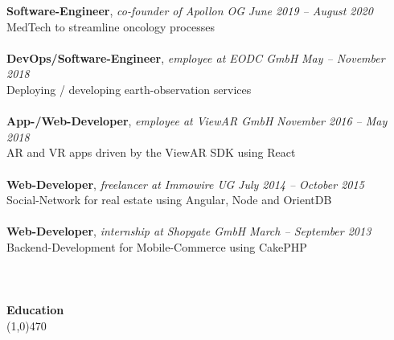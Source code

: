 \documentclass[10pt]{article} %
\begin{document}
\noindent
\noindent
{\bf Software-Engineer}, \textit{co-founder of Apollon OG}  \hfill \textit{ June 2019 -- August 2020 } \\ 
MedTech to streamline oncology processes  \\\\
\noindent
\noindent
{\bf DevOps/Software-Engineer}, \textit{employee at EODC GmbH}  \hfill \textit{ May -- November 2018 } \\ 
Deploying / developing earth-observation services\\\\
\noindent
\noindent
{\bf App-/Web-Developer}, \textit{employee at ViewAR GmbH}  \hfill \textit{ November 2016 -- May 2018 } \\ 
AR and VR apps driven by the ViewAR SDK using React\\\\
\noindent
{\bf Web-Developer}, \textit{freelancer at Immowire UG}  \hfill \textit{ July 2014 -- October 2015 } \\ 
Social-Network for real estate using Angular, Node and OrientDB\\\\
\noindent
{\bf Web-Developer}, \textit{internship at Shopgate GmbH}  \hfill \textit{ March -- September 2013 } \\ 
Backend-Development for Mobile-Commerce using CakePHP\\\\
\noindent
\noindent %
\\\\
{\Large \bf Education}\\
\line(1,0){470}\\
\end{document}
